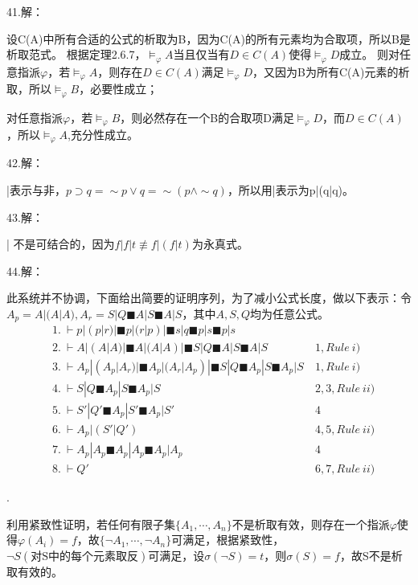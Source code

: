 \documentclass[a4paper]{ctexart}
\begin{document}
\noindent 41.解：

设C(A)中所有合适的公式的析取为B，因为C(A)的所有元素均为合取项，所以B是析取范式。
根据定理2.6.7，$\models_{\varphi}A$当且仅当有$D\in C(A)$使得$\models_\varphi D$成立。
则对任意指派$\varphi$，若$\models_{\varphi}A$，则存在$D\in C(A)$满足$\models_\varphi D$，又因为B为所有C(A)元素的析取，所以$\models_\varphi B$，必要性成立；

对任意指派$\varphi$，若$\models_{\varphi}B$，则必然存在一个B的合取项D满足$\models_\varphi D$，而$D\in C(A)$，所以$\models_{\varphi}A$,充分性成立。\newline

\noindent 42.解：

|表示与非，$p\supset q=\sim p\vee q=\sim(p\wedge\sim q)$，所以用|表示为p|(q|q)。\newline

\noindent 43.解：

| 不是可结合的，因为$f|f|t\not\equiv f|(f|t)$为永真式。\newline

\noindent 44.解：

此系统并不协调，下面给出简要的证明序列，为了减小公式长度，做以下表示：令$A_p=A|(A|A),A_r=S|Q \blacksquare A|S \blacksquare A|S$，其中$A,S,Q$均为任意公式。
\begin{align*}
  &1. \ \vdash p|(p|r)|\blacksquare p|(r|p)| \blacksquare s|q \blacksquare p|s \blacksquare p|s \\
  &2. \ \vdash A|(A|A)|\blacksquare A|(A|A)| \blacksquare S|Q \blacksquare A|S \blacksquare A|S \ &1,Rule\ i)\\
  &3. \ \vdash A_p|(A_p|A_r)|\blacksquare A_p|(A_r|A_p)| \blacksquare S|Q \blacksquare A_p|S \blacksquare A_p|S \ &1,Rule\ i)\\
  &4. \ \vdash S|Q \blacksquare A_p|S \blacksquare A_p|S \ &2,3,Rule\ ii)\\
  &5. \ \vdash S'|Q' \blacksquare A_p|S' \blacksquare A_p|S' \ &4\\
  &6. \ \vdash A_p|(S'|Q') \ &4,5,Rule\ ii)\\
  &7. \ \vdash A_p|A_p \blacksquare A_p|A_p \blacksquare A_p|A_p \ &4 \\
  &8. \ \vdash Q' \ &6,7,Rule\ ii)
\end{align*}

.

利用紧致性证明，若任何有限子集$\{A_1,\cdots,A_n\}$不是析取有效，则存在一个指派$\varphi$使得$\varphi(A_i)=f$，故$\{\neg A_1,\cdots,\neg A_n\}$可满足，根据紧致性，$\neg S(\text{对S中的每个元素取反})$可满足，设$\sigma(\neg S)=t$，则$\sigma(S)=f$，故S不是析取有效的。
\end{document}

